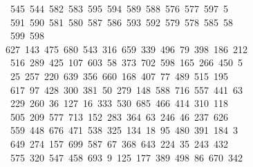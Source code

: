 \begin{tabbing}
\ 545\ 544\ 582\ 583\ 595\ 594\ 589\ 588\ 576\ 577\ 597\ 5\\[0pt]
\ 591\ 590\ 581\ 580\ 587\ 586\ 593\ 592\ 579\ 578\ 585\ 58\\[0pt]
\ 599\ 598\ \\[0pt]
627\ 143\ 475\ 680\ 543\ 316\ 659\ 339\ 496\ 79\ 398\ 186\ 212\\[0pt]
\>\ 516\ 289\ 425\ 107\ 603\ 58\ 373\ 702\ 598\ 165\ 266\ 450\ 5\\[0pt]
\ 25\ 257\ 220\ 639\ 356\ 660\ 168\ 407\ 77\ 489\ 515\ 195\\[0pt]
\>\ 617\ 97\ 428\ 300\ 381\ 50\ 279\ 148\ 588\ 716\ 557\ 441\ 63\\[0pt]
\ 229\ 260\ 36\ 127\ 16\ 333\ 530\ 685\ 466\ 414\ 310\ 118\ \\[0pt]
\ 505\ 209\ 577\ 713\ 152\ 283\ 364\ 63\ 246\ 46\ 237\ 626\\[0pt]
\>\ 559\ 448\ 676\ 471\ 538\ 325\ 134\ 18\ 95\ 480\ 391\ 184\ 3\\[0pt]
\ 649\ 274\ 157\ 699\ 587\ 67\ 368\ 643\ 224\ 35\ 243\ 432\\[0pt]
\>\ 575\ 320\ 547\ 458\ 693\ 9\ 125\ 177\ 389\ 498\ 86\ 670\ 342\\[0pt]

\end{tabbing}
